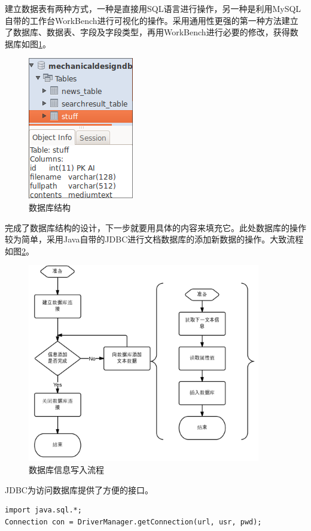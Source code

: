 \documentclass[12pt,a4paper]{article}
\newcommand{\wuhao}{\fontsize{10.5pt}{\baselineskip}\selectfont}
\begin{document}
	建立数据表有两种方式，一种是直接用{\Times SQL}语言进行操作，另一种是利用{\Times MySQL}自带的工作台{\Times WorkBench}进行可视化的操作。采用通用性更强的第一种方法建立了数据库、数据表、字段及字段类型，再用{\Times WorkBench}进行必要的修改，获得数据库如图\ref{fig:数据库结构}。
	
	\begin{figure}[htbp] 
	\centering\includegraphics[scale=0.5]{fig/stuffdb.png} 
	\caption{\wuhao 数据库结构}\label{fig:数据库结构} 
	\end{figure}
	
\newpage	
	完成了数据库结构的设计，下一步就要用具体的内容来填充它。此处数据库的操作较为简单，采用{\Times Java}自带的{\Times JDBC}进行文档数据库的添加新数据的操作。大致流程如图\ref{fig:数据库信息写入流程}。
	
	\begin{figure}[htbp] 
	\centering\includegraphics[width=4in]{fig/createdb.png} 
	\caption{\wuhao 数据库信息写入流程}\label{fig:数据库信息写入流程} 
	\end{figure}
	
	{\Times JDBC}为访问数据库提供了方便的接口。
	\lstset{language=Java,frame=lines,basicstyle=\Times, commentstyle=\SimSun,texcl=true}
	\begin{lstlisting}
import java.sql.*;
Connection con = DriverManager.getConnection(url, usr, pwd);
	\end{lstlisting}	
\end{document}
